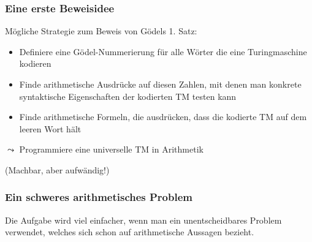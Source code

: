 \documentclass[aspectratio=1610,onlymath]{beamer}
\begin{document}
\begin{frame}\frametitle{Eine erste Beweisidee}

Mögliche Strategie zum Beweis von Gödels 1. Satz:
\begin{itemize}
\item Definiere eine Gödel-Nummerierung für alle Wörter die eine Turingmaschine kodieren
\item Finde arithmetische Ausdrücke auf diesen Zahlen, mit denen man konkrete syntaktische Eigenschaften der kodierten TM testen kann
\item Finde arithmetische Formeln, die ausdrücken, dass die kodierte TM auf dem leeren Wort hält
\end{itemize}\pause
\alert{$\leadsto$ Programmiere eine universelle TM in Arithmetik}\bigskip

(Machbar, aber aufwändig!)

\end{frame}

\begin{frame}\frametitle{Ein schweres arithmetisches Problem}

Die Aufgabe wird viel einfacher, wenn man ein unentscheidbares Problem verwendet, welches sich schon auf arithmetische Aussagen bezieht.

\pause


\end{frame}
\end{document}
